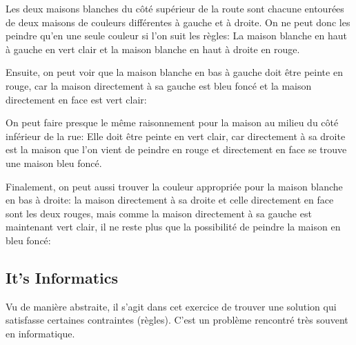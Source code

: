 \documentclass[a4paper,11pt]{report}
\newcommand{\taskGraphicsFolder}{..}
\begin{document}
Les deux maisons blanches du côté supérieur de la route sont chacune entourées de deux maisons de couleurs différentes à gauche et à droite. On ne peut donc les peindre qu’en une seule couleur si l’on suit les règles: La maison blanche en haut à gauche en vert clair et la maison blanche en haut à droite en rouge.

{\centering%
\par}

Ensuite, on peut voir que la maison blanche en bas à gauche doit être peinte en rouge, car la maison directement à sa gauche est bleu foncé et la maison directement en face est vert clair:

{\centering%
\par}

On peut faire presque le même raisonnement pour la maison au milieu du côté inférieur de la rue: Elle doit être peinte en vert clair, car directement à sa droite est la maison que l’on vient de peindre en rouge et directement en face se trouve une maison bleu foncé.

{\centering%
\par}

\begin{samepage}
Finalement, on peut aussi trouver la couleur appropriée pour la maison blanche en bas à droite: la maison directement à sa droite et celle directement en face sont les deux rouges, mais comme la maison directement à sa gauche est maintenant vert clair, il ne reste plus que la possibilité de peindre la maison en bleu foncé:

\nopagebreak

{\centering%
\par}
\end{samepage}


\subsection*{It’s Informatics}

Vu de manière abstraite, il s’agit dans cet exercice de trouver une solution qui satisfasse certaines contraintes (règles). C’est un problème rencontré très souvent en informatique.
\end{document}
